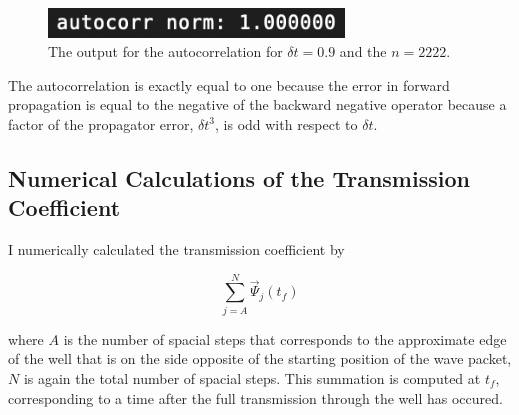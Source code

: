 \documentclass[letterpaper,12pt]{article}
\begin{document}
    \begin{figure}[H]
        \centering
        \includegraphics[width=0.7\textwidth]{autocorr.out.png}
        \caption[Autocorrelation output]{The output for the autocorrelation for
        $\delta t = 0.9$ and the $n = 2222$.}
    \end{figure}

    The autocorrelation is exactly equal to one because the error in forward
    propagation is equal to the negative of the backward negative operator
    because a factor of the propagator error, $\delta t^3$, is odd with respect
    to $\delta t$.

    \subsection*{Numerical Calculations of the Transmission Coefficient}
    \label{subsec:num}

    I numerically calculated the transmission coefficient by

    \[
        \sum_{j = A}^N \vec{\Psi}_j(t_f)
    \]

    where $A$ is the number of spacial steps that corresponds to the approximate
    edge of the well that is on the side opposite of the starting position of
    the wave packet, $N$ is again the total number of spacial steps. This
    summation is computed at $t_f$, corresponding to a time after the full
    transmission through the well has occured.
\end{document}
